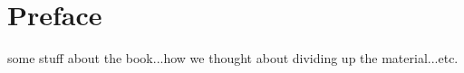 \chapter*{Preface}

some stuff about the book...how we thought about dividing up the material...etc.

